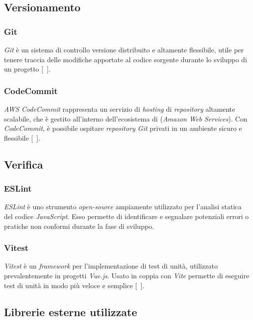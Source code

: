 \subsection{Versionamento}\label{subsec:versionamento}
\subsubsection{Git}\label{subsubsec:git}
\textit{Git} è un sistema di controllo versione distribuito e altamente flessibile, utile per tenere traccia delle modifiche apportate al codice sorgente durante lo sviluppo di un progetto  [~\cite{site:git}].
\subsubsection{CodeCommit}\label{subsubsec:CodeCommit}
\textit{AWS CodeCommit} rappresenta un servizio di \textit{hosting} di \textit{repository} altamente scalabile, che è gestito all'interno dell'ecosistema di  (\textit{Amazon Web Services}). 
Con \textit{CodeCommit}, è possibile ospitare \textit{repository Git} privati in un ambiente sicuro e flessibile [~\cite{site:code-commit}].

\subsection{Verifica}\label{subsec:verifica}
\subsubsection{ESLint}\label{subsubsec:eslint}
\textit{ESLint} è uno strumento \textit{open-source} ampiamente utilizzato per l'analisi statica del codice \textit{JavaScript}. Esso permette di identificare e segnalare potenziali errori o pratiche non conformi durante la fase di sviluppo.
\subsubsection{Vitest}\label{subsubsec:vitest}
\textit{Vitest} è un \textit{framework} per l'implementazione di test di unità, utilizzato prevalentemente in progetti \textit{Vue.js}.
Usato in coppia con \textit{Vite} permette di eseguire test di unità in modo più veloce e semplice [~\cite{site:vitest}].

\subsection{Librerie esterne utilizzate}\label{subsec:librerie-esterne}
